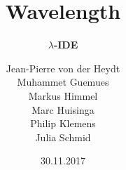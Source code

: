 \documentclass[10pt]{beamer}
\title[] %
{ %
      \textbf{Wavelength}
}
\subtitle[$\lambda$-IDE]
{
      \textbf{$\lambda$-IDE}
}
\author[wavelength]
{      Jean-Pierre von der Heydt \\  
	   Muhammet Guemues \\
       Markus Himmel \\
       Marc Huisinga \\
       Philip Klemens \\ 
       Julia Schmid   
}
\institute[]
{
      
  
}
\date{30.11.2017}
\begin{document}

{
\begin{frame}[plain]
\maketitle
\end{frame}
}


\end{document}
